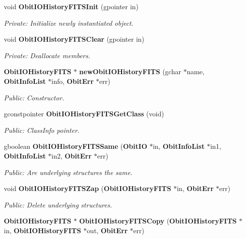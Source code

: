 \begin{CompactItemize}
\item 
void {\bf Obit\-IOHistory\-FITSInit} (gpointer in)
\begin{CompactList}\small\item\em Private: Initialize newly instantiated object. \item\end{CompactList}\item 
void {\bf Obit\-IOHistory\-FITSClear} (gpointer in)
\begin{CompactList}\small\item\em Private: Deallocate members. \item\end{CompactList}\item 
{\bf Obit\-IOHistory\-FITS} $\ast$ {\bf new\-Obit\-IOHistory\-FITS} (gchar $\ast$name, {\bf Obit\-Info\-List} $\ast$info, {\bf Obit\-Err} $\ast$err)
\begin{CompactList}\small\item\em Public: Constructor. \item\end{CompactList}\item 
gconstpointer {\bf Obit\-IOHistory\-FITSGet\-Class} (void)
\begin{CompactList}\small\item\em Public: Class\-Info pointer. \item\end{CompactList}\item 
gboolean {\bf Obit\-IOHistory\-FITSSame} ({\bf Obit\-IO} $\ast$in, {\bf Obit\-Info\-List} $\ast$in1, {\bf Obit\-Info\-List} $\ast$in2, {\bf Obit\-Err} $\ast$err)
\begin{CompactList}\small\item\em Public: Are underlying structures the same. \item\end{CompactList}\item 
void {\bf Obit\-IOHistory\-FITSZap} ({\bf Obit\-IOHistory\-FITS} $\ast$in, {\bf Obit\-Err} $\ast$err)
\begin{CompactList}\small\item\em Public: Delete underlying structures. \item\end{CompactList}\item 
{\bf Obit\-IOHistory\-FITS} $\ast$ {\bf Obit\-IOHistory\-FITSCopy} ({\bf Obit\-IOHistory\-FITS} $\ast$in, {\bf Obit\-IOHistory\-FITS} $\ast$out, {\bf Obit\-Err} $\ast$err)

\end{CompactItemize}
